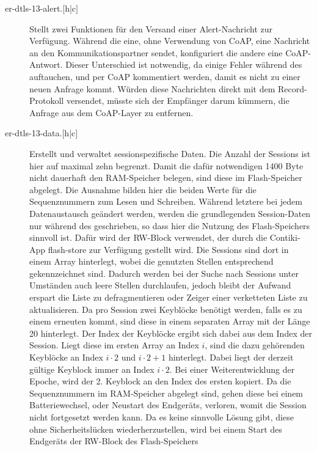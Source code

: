 \begin{description}
  \item[er-dtls-13-alert.{$[$h|c$]$}] Stellt zwei Funktionen für den Versand einer Alert-Nachricht zur Verfügung.
					Während die eine, ohne Verwendung von CoAP, eine Nachricht an den Kommunikationspartner sendet,
					konfiguriert die andere eine CoAP-Antwort. Dieser Unterschied ist notwendig, da einige Fehler während
					des  auftauchen, und per CoAP kommentiert werden, damit es nicht zu einer neuen Anfrage kommt.
					Würden diese Nachrichten direkt mit dem Record-Protokoll versendet, müsste sich der Empfänger darum kümmern,
					die Anfrage aus dem CoAP-Layer zu entfernen.
  \item[er-dtls-13-data.{$[$h|c$]$}] Erstellt und verwaltet sessionspezifische Daten. Die Anzahl der Sessions ist hier auf maximal zehn begrenzt.
					Damit die dafür notwendigen 1400 Byte nicht dauerhaft den RAM-Speicher belegen, sind diese im Flash-Speicher
					abgelegt. Die Ausnahme bilden hier die beiden Werte für die Sequenznummern zum Lesen und Schreiben.
					Während letztere bei jedem Datenaustausch geändert werden, werden die grundlegenden Session-Daten nur während
					des  geschrieben, so dass hier die Nutzung des Flash-Speichers sinnvoll ist. Dafür wird der RW-Block
					verwendet, der durch die Contiki-App flash-store zur Verfügung gestellt wird. Die Sessions sind dort in einem
					Array hinterlegt, wobei die genutzten Stellen entsprechend gekennzeichnet sind. Dadurch werden bei der Suche
					nach Sessions unter Umständen auch leere Stellen durchlaufen, jedoch bleibt der Aufwand erspart die Liste zu
					defragmentieren oder Zeiger einer verketteten Liste zu aktualisieren. Da pro Session zwei Keyblöcke benötigt werden,
					falls es zu einem erneuten  kommt, sind diese in einem separaten Array mit der Länge 20 hinterlegt.
					Der Index der Keyblöcke ergibt sich dabei aus dem Index der Session. Liegt diese im ersten Array an Index $ i $,
					sind die dazu gehörenden Keyblöcke an Index $ i\cdot2 $ und $ i\cdot2+1 $ hinterlegt. Dabei liegt der derzeit gültige
					Keyblock immer an Index $ i\cdot2 $. Bei einer Weiterentwicklung der Epoche, wird der 2. Keyblock an den Index
					des ersten kopiert. Da die Sequenznummern im RAM-Speicher abgelegt sind, gehen diese bei einem Batteriewechsel,
					oder Neustart des Endgeräts, verloren, womit die Session nicht fortgesetzt werden kann. Da es keine sinnvolle Lösung gibt,
					diese ohne Sicherheitslücken wiederherzustellen, wird bei einem Start des Endgeräts der RW-Block des Flash-Speichers

\end{description}
